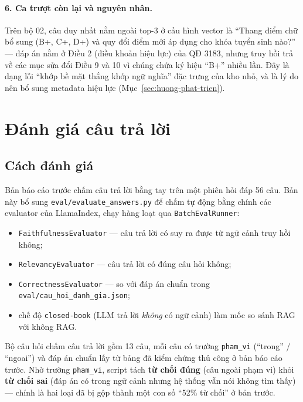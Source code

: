 \paragraph{6. Ca trượt còn lại và nguyên nhân.} Trên bộ 02, câu duy nhất nằm ngoài top-3 ở cấu hình
vector là ``Thang điểm chữ bổ sung (B+, C+, D+) và quy đổi điểm mới áp dụng cho khóa tuyển sinh
nào?'' --- đáp án nằm ở Điều 2 (điều khoản hiệu lực) của QĐ 3183, nhưng truy hồi trả về các mục sửa
đổi Điều 9 và 10 vì chúng chứa ký hiệu ``B+'' nhiều lần. Đây là dạng lỗi ``khớp bề mặt thắng khớp
ngữ nghĩa'' đặc trưng của kho nhỏ, và là lý do nên bổ sung metadata hiệu lực (Mục~\ref{sec:huong-phat-trien}).


\section{Đánh giá câu trả lời}

\subsection{Cách đánh giá}

Bản báo cáo trước chấm câu trả lời bằng tay trên một phiên hỏi đáp 56 câu. Bản này bổ sung
\texttt{eval/evaluate\_answers.py} để chấm tự động bằng chính các evaluator của LlamaIndex, chạy hàng
loạt qua \texttt{BatchEvalRunner}:

\begin{itemize}
  \item \texttt{FaithfulnessEvaluator} --- câu trả lời có suy ra được từ ngữ cảnh truy hồi không;
  \item \texttt{RelevancyEvaluator} --- câu trả lời có đúng câu hỏi không;
  \item \texttt{CorrectnessEvaluator} --- so với đáp án chuẩn trong \texttt{eval/cau\_hoi\_danh\_gia.json};
  \item chế độ \texttt{closed-book} (LLM trả lời \emph{không} có ngữ cảnh) làm mốc so sánh RAG với
        không RAG.
\end{itemize}

Bộ câu hỏi chấm câu trả lời gồm 13 câu, mỗi câu có trường \texttt{pham\_vi} (``trong'' / ``ngoai'')
và đáp án chuẩn lấy từ bảng đã kiểm chứng thủ công ở bản báo cáo trước. Nhờ trường \texttt{pham\_vi},
script tách \textbf{từ chối đúng} (câu ngoài phạm vi) khỏi \textbf{từ chối sai} (đáp án có trong ngữ
cảnh nhưng hệ thống vẫn nói không tìm thấy) --- chính là hai loại đã bị gộp thành một con số ``52\%
từ chối'' ở bản trước.

